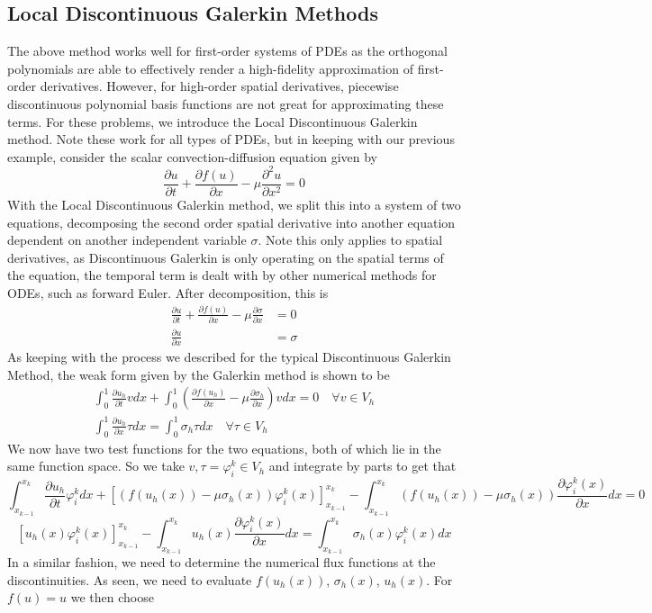 \documentclass[openany]{book}
\newcommand{\p}[2]{\frac{\partial#1}{\partial#2}}
\begin{document}
\subsection{Local Discontinuous Galerkin Methods}
The above method works well for first-order systems of PDEs as the orthogonal polynomials are able to effectively render a high-fidelity approximation of first-order derivatives. However, for high-order spatial derivatives, piecewise discontinuous polynomial basis functions are not great for approximating these terms. For these problems, we introduce the Local Discontinuous Galerkin method. Note these work for all types of PDEs, but in keeping with our previous example, consider the scalar convection-diffusion equation given by
$$\p{u}{t} + \p{f(u)}{x} - \mu \p{^2u}{x^2} = 0 $$
With the Local Discontinuous Galerkin method, we split this into a system of two equations, decomposing the second order spatial derivative into another equation dependent on another independent variable $\sigma$. Note this only applies to spatial derivatives, as Discontinuous Galerkin is only operating on the spatial terms of the equation, the temporal term is dealt with by other numerical methods for ODEs, such as forward Euler. After decomposition, this is
\begin{align*}
    \p{u}{t} + \p{f(u)}{x} - \mu \p{\sigma}{x} &= 0 \\ \p{u}{x} &= \sigma
\end{align*}
As keeping with the process we described for the typical Discontinuous Galerkin Method, the weak form given by the Galerkin method is shown to be
\begin{align*}
\int^1_0 \p{u_h}{t} vdx + \int^1_0 \left( \p{f(u_h)}{x} - \mu \p{\sigma_h}{x} \right) v dx = 0 \quad \forall v \in V_h \\
\int^1_0 \p{u_h}{x} \tau dx  = \int^1_0 \sigma_h \tau dx \quad \forall \tau \in V_h
\end{align*}
We now have two test functions for the two equations, both of which lie in the same function space. So we take $v, \tau = \varphi_i^k \in V_h$ and integrate by parts to get that
$$
\int^{x_k}_{x_{k-1}} \p{u_h}{t} \varphi^k_i dx + \left[ \left(f(u_h(x)) - \mu \sigma_h(x)\right) \varphi^k_i(x) \right]^{x_k}_{x_{k-1}} - \int^{x_k}_{x_{k-1}} (f(u_h(x)) - \mu \sigma_h(x)) \p{\varphi_i^k(x)}{x} dx = 0
$$
$$
\left[ u_h(x) \varphi_i^k(x) \right]^{x_k}_{x_{k-1}} - \int^{x_k}_{x_{k-1}} u_h(x) \p{\varphi^k_i(x)}{x} dx = \int^{x_k}_{x_{k-1}} \sigma_h(x) \varphi^k_i(x) dx
$$
In a similar fashion, we need to determine the numerical flux functions at the discontinuities. As seen, we need to evaluate $f(u_h(x))$, $\sigma_h(x)$, $u_h(x)$. For $f(u)=u$ we then choose 
\end{document}
